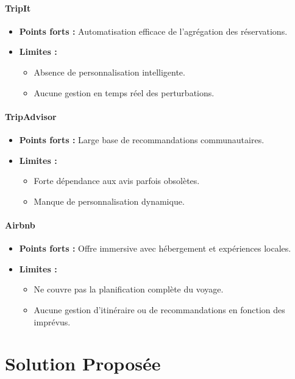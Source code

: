\paragraph{TripIt}
\begin{itemize}
    \item \textbf{Points forts :} Automatisation efficace de l’agrégation des réservations.
    \item \textbf{Limites :}
    \begin{itemize}
        \item Absence de personnalisation intelligente.
        \item Aucune gestion en temps réel des perturbations.
    \end{itemize}
\end{itemize}

\paragraph{TripAdvisor}
\begin{itemize}
    \item \textbf{Points forts :} Large base de recommandations communautaires.
    \item \textbf{Limites :}
    \begin{itemize}
        \item Forte dépendance aux avis parfois obsolètes.
        \item Manque de personnalisation dynamique.
    \end{itemize}
\end{itemize}

\paragraph{Airbnb}
\begin{itemize}
    \item \textbf{Points forts :} Offre immersive avec hébergement et expériences locales.
    \item \textbf{Limites :}
    \begin{itemize}
        \item Ne couvre pas la planification complète du voyage.
        \item Aucune gestion d’itinéraire ou de recommandations en fonction des imprévus.
    \end{itemize}
\end{itemize}

\section{Solution Proposée}

